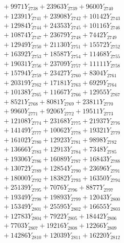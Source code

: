 \documentclass[a4paper,10pt]{article}
\begin{document}
{\begin{align}
&\;  + 9971 Y_{2738} + 23963 Y_{2739} + 9600 Y_{2740} \\[0.3ex]
&\;  + 12391 Y_{2741} + 23908 Y_{2742} + 10142 Y_{2743} \\[0.3ex]
&\;  + 12984 Y_{2744} + 24353 Y_{2745} + 10116 Y_{2746} \\[0.3ex]
&\;  + 10874 Y_{2747} + 23679 Y_{2748} + 7442 Y_{2749} \\[0.3ex]
&\;  + 12949 Y_{2750} + 21130 Y_{2751} + 15572 Y_{2752} \\[0.3ex]
&\;  + 16392 Y_{2753} + 18587 Y_{2754} + 11468 Y_{2755} \\[0.3ex]
&\;  + 19031 Y_{2756} + 23709 Y_{2757} + 11111 Y_{2758} \\[0.5ex]\allowbreak
&\;  + 15794 Y_{2759} + 23427 Y_{2760} + 8304 Y_{2761} \\[0.3ex]
&\;  + 20319 Y_{2762} + 17181 Y_{2763} + 6929 Y_{2764} \\[0.3ex]
&\;  + 10138 Y_{2765} + 11667 Y_{2766} + 12955 Y_{2767} \\[0.3ex]
&\;  + 8521 Y_{2768} + 8081 Y_{2769} + 23811 Y_{2770} \\[0.3ex]
&\;  + 9960 Y_{2771} + 9206 Y_{2772} + 19511 Y_{2773} \\[0.3ex]
&\;  + 12108 Y_{2774} + 23168 Y_{2775} + 21937 Y_{2776} \\[0.3ex]
&\;  + 14149 Y_{2777} + 10062 Y_{2778} + 19321 Y_{2779} \\[0.3ex]
&\;  + 16102 Y_{2780} + 12923 Y_{2781} + 9898 Y_{2782} \\[0.3ex]
&\;  + 13666 Y_{2783} + 12913 Y_{2784} + 7348 Y_{2785} \\[0.3ex]
&\;  + 19306 Y_{2786} + 16089 Y_{2787} + 16843 Y_{2788} \\[0.5ex]\allowbreak
&\;  + 13072 Y_{2789} + 12854 Y_{2790} + 23696 Y_{2791} \\[0.3ex]
&\;  + 18000 Y_{2792} + 18382 Y_{2793} + 16350 Y_{2794} \\[0.3ex]
&\;  + 25139 Y_{2795} + 7076 Y_{2796} + 8877 Y_{2797} \\[0.3ex]
&\;  + 19349 Y_{2798} + 19893 Y_{2799} + 12043 Y_{2800} \\[0.3ex]
&\;  + 15349 Y_{2801} + 25595 Y_{2802} + 16655 Y_{2803} \\[0.3ex]
&\;  + 12783 Y_{2804} + 7922 Y_{2805} + 18442 Y_{2806} \\[0.3ex]
&\;  + 7703 Y_{2807} + 19216 Y_{2808} + 12266 Y_{2809} \\[0.3ex]
&\;  + 14286 Y_{2810} + 12039 Y_{2811} + 16220 Y_{2812} \\[0.3ex]

\end{align}}
\end{document}
